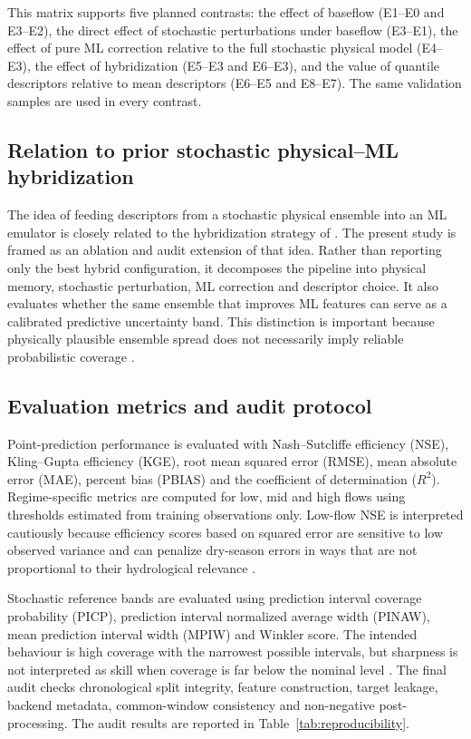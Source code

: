 \documentclass[a4paper,fleqn]{cas-sc}
\begin{document}
This matrix supports five planned contrasts: the effect of baseflow
(E1--E0 and E3--E2), the direct effect of stochastic perturbations under
baseflow (E3--E1), the effect of pure ML correction relative to the full
stochastic physical model (E4--E3), the effect of hybridization
(E5--E3 and E6--E3), and the value of quantile descriptors relative to
mean descriptors (E6--E5 and E8--E7). The same validation samples are
used in every contrast.

\subsection{Relation to prior stochastic physical--ML hybridization}
\label{subsec:relation}

The idea of feeding descriptors from a stochastic physical ensemble into
an ML emulator is closely related to the hybridization strategy of
\citet{houenafa2025hybridization}. The present study is framed as an
ablation and audit extension of that idea. Rather than reporting only
the best hybrid configuration, it decomposes the pipeline into physical
memory, stochastic perturbation, ML correction and descriptor choice. It
also evaluates whether the same ensemble that improves ML features can
serve as a calibrated predictive uncertainty band. This distinction is
important because physically plausible ensemble spread does not
necessarily imply reliable probabilistic coverage
\citep{atger1999skill,franz2011evaluating,papacharalampous2022review}.

\subsection{Evaluation metrics and audit protocol}\label{subsec:evaluation}

Point-prediction performance is evaluated with Nash--Sutcliffe
efficiency (NSE), Kling--Gupta efficiency (KGE), root mean squared error
(RMSE), mean absolute error (MAE), percent bias (PBIAS) and the
coefficient of determination ($R^2$). Regime-specific metrics are
computed for low, mid and high flows using thresholds estimated from
training observations only. Low-flow NSE is interpreted cautiously
because efficiency scores based on squared error are sensitive to low
observed variance and can penalize dry-season errors in ways that are
not proportional to their hydrological relevance
\citep{pushpalatha2012review}.

Stochastic reference bands are evaluated using prediction interval
coverage probability (PICP), prediction interval normalized average
width (PINAW), mean prediction interval width (MPIW) and Winkler score.
The intended behaviour is high coverage with the narrowest possible
intervals, but sharpness is not interpreted as skill when coverage is
far below the nominal level \citep{franz2011evaluating,abaza2017incidence,papacharalampous2022review}.
The final audit checks chronological split integrity, feature
construction, target leakage, backend metadata, common-window
consistency and non-negative post-processing. The audit results are
reported in Table~\ref{tab:reproducibility}.
\end{document}
